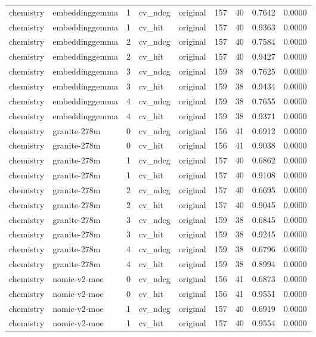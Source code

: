 \begin{tabular}{llrllrrrr}
chemistry & embeddinggemma & 1 & cv\_ndcg & original & 157 & 40 & 0.7642 & 0.0000 \\
chemistry & embeddinggemma & 1 & cv\_hit & original & 157 & 40 & 0.9363 & 0.0000 \\
chemistry & embeddinggemma & 2 & cv\_ndcg & original & 157 & 40 & 0.7584 & 0.0000 \\
chemistry & embeddinggemma & 2 & cv\_hit & original & 157 & 40 & 0.9427 & 0.0000 \\
chemistry & embeddinggemma & 3 & cv\_ndcg & original & 159 & 38 & 0.7625 & 0.0000 \\
chemistry & embeddinggemma & 3 & cv\_hit & original & 159 & 38 & 0.9434 & 0.0000 \\
chemistry & embeddinggemma & 4 & cv\_ndcg & original & 159 & 38 & 0.7655 & 0.0000 \\
chemistry & embeddinggemma & 4 & cv\_hit & original & 159 & 38 & 0.9371 & 0.0000 \\
chemistry & granite-278m & 0 & cv\_ndcg & original & 156 & 41 & 0.6912 & 0.0000 \\
chemistry & granite-278m & 0 & cv\_hit & original & 156 & 41 & 0.9038 & 0.0000 \\
chemistry & granite-278m & 1 & cv\_ndcg & original & 157 & 40 & 0.6862 & 0.0000 \\
chemistry & granite-278m & 1 & cv\_hit & original & 157 & 40 & 0.9108 & 0.0000 \\
chemistry & granite-278m & 2 & cv\_ndcg & original & 157 & 40 & 0.6695 & 0.0000 \\
chemistry & granite-278m & 2 & cv\_hit & original & 157 & 40 & 0.9045 & 0.0000 \\
chemistry & granite-278m & 3 & cv\_ndcg & original & 159 & 38 & 0.6845 & 0.0000 \\
chemistry & granite-278m & 3 & cv\_hit & original & 159 & 38 & 0.9245 & 0.0000 \\
chemistry & granite-278m & 4 & cv\_ndcg & original & 159 & 38 & 0.6796 & 0.0000 \\
chemistry & granite-278m & 4 & cv\_hit & original & 159 & 38 & 0.8994 & 0.0000 \\
chemistry & nomic-v2-moe & 0 & cv\_ndcg & original & 156 & 41 & 0.6873 & 0.0000 \\
chemistry & nomic-v2-moe & 0 & cv\_hit & original & 156 & 41 & 0.9551 & 0.0000 \\
chemistry & nomic-v2-moe & 1 & cv\_ndcg & original & 157 & 40 & 0.6919 & 0.0000 \\
chemistry & nomic-v2-moe & 1 & cv\_hit & original & 157 & 40 & 0.9554 & 0.0000 \\

\end{tabular}
